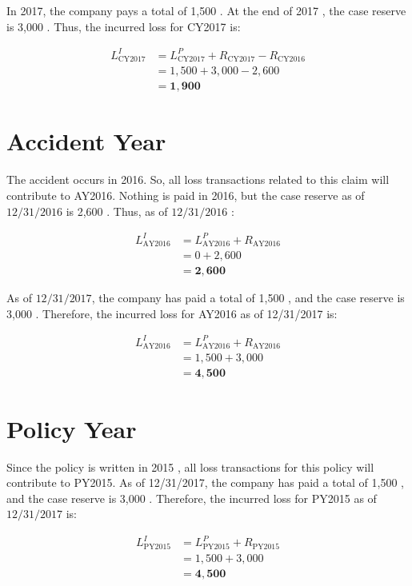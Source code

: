 \documentclass[10pt]{article}
\begin{document}
In 2017, the company pays a total of 1,500 . At the end of 2017 , the case reserve is 3,000 . Thus, the incurred loss for CY2017 is:

$$
\begin{aligned}
L_{\mathrm{CY} 2017}^{I} & =L_{\mathrm{CY} 2017}^{P}+R_{\mathrm{CY} 2017}-R_{\mathrm{CY} 2016} \\
& =1,500+3,000-2,600 \\
& =\mathbf{1 , 9 0 0}
\end{aligned}
$$

\section{Accident Year}
The accident occurs in 2016. So, all loss transactions related to this claim will contribute to AY2016. Nothing is paid in 2016, but the case reserve as of $12 / 31 / 2016$ is 2,600 . Thus, as of $12 / 31 / 2016$ :

$$
\begin{aligned}
L_{\mathrm{AY} 2016}^{I} & =L_{\mathrm{AY} 2016}^{P}+R_{\mathrm{AY} 2016} \\
& =0+2,600 \\
& =\mathbf{2 , 6 0 0}
\end{aligned}
$$

As of $12 / 31 / 2017$, the company has paid a total of 1,500 , and the case reserve is 3,000 . Therefore, the incurred loss for AY2016 as of 12/31/2017 is:

$$
\begin{aligned}
L_{\mathrm{AY} 2016}^{I} & =L_{\mathrm{AY} 2016}^{P}+R_{\mathrm{AY} 2016} \\
& =1,500+3,000 \\
& =\mathbf{4 , 5 0 0}
\end{aligned}
$$

\section{Policy Year}
Since the policy is written in 2015 , all loss transactions for this policy will contribute to PY2015. As of 12/31/2017, the company has paid a total of 1,500 , and the case reserve is 3,000 . Therefore, the incurred loss for PY2015 as of $12 / 31 / 2017$ is:

$$
\begin{aligned}
L_{\mathrm{PY} 2015}^{I} & =L_{\mathrm{PY} 2015}^{P}+R_{\mathrm{PY} 2015} \\
& =1,500+3,000 \\
& =\mathbf{4 , 5 0 0}
\end{aligned}
$$
\end{document}
